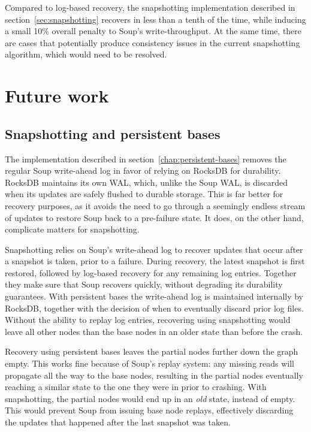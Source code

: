 Compared to log-based recovery, the snapshotting implementation described in
section~\ref{sec:snapshotting} recovers in less than a tenth of the time, while
inducing a small 10\% overall penalty to Soup's write-throughput. At the same
time, there are cases that potentially produce consistency issues in the current
snapshotting algorithm, which would need to be resolved.



\section{Future work}\label{sec:future-work}

\subsection{Snapshotting and persistent bases}

The  implementation described in
section~\ref{chap:persistent-bases} removes the regular Soup write-ahead log in
favor of relying on RocksDB for durability. RocksDB maintains its own WAL,
which, unlike the Soup WAL, is discarded when its updates are safely flushed to
durable storage. This is far better for recovery purposes, as it avoids the need
to go through a seemingly endless stream of updates to restore Soup back to a
pre-failure state. It does, on the other hand, complicate matters for
snapshotting.

Snapshotting relies on Soup's write-ahead log to recover updates that occur
after a snapshot is taken, prior to a failure. During recovery, the latest
snapshot is first restored, followed by log-based recovery for any remaining log
entries. Together they make sure that Soup recovers quickly, without degrading
its durability guarantees. With persistent bases the write-ahead log is
maintained internally by RocksDB, together with the decision of when to
eventually discard prior log files. Without the ability to replay log entries,
recovering using snapshotting would leave all other nodes than the base nodes in
an older state than before the crash.

Recovery using persistent bases leaves the partial nodes further down the graph
empty. This works fine because of Soup's replay system: any missing reads will
propagate all the way to the base nodes, resulting in the partial nodes
eventually reaching a similar state to the one they were in prior to crashing.
With snapshotting, the partial nodes would end up in an \textit{old} state,
instead of empty. This would prevent Soup from issuing base node replays,
effectively discarding the updates that happened after the last snapshot was
taken.

